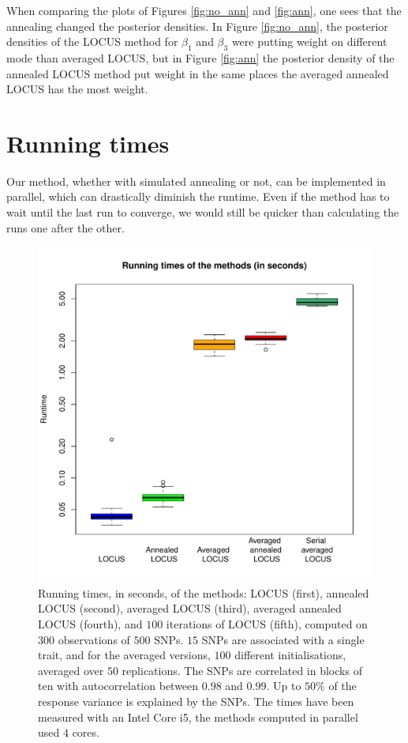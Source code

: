 \documentclass[a4paper, 11pt]{report}
\numberwithin{equation}{chapter}
\begin{document}
When comparing the plots of Figures \ref{fig:no_ann} and \ref{fig:ann}, one sees that the annealing changed the posterior densities. In Figure \ref{fig:no_ann}, the posterior densities of the LOCUS method for $\beta_1$ and $\beta_3$ were putting weight on different mode than averaged LOCUS, but in Figure \ref{fig:ann} the posterior density of the annealed LOCUS method put weight in the same places the averaged annealed LOCUS has the most weight. 

\section{Running times}

Our method, whether with simulated annealing or not, can be implemented in parallel, which can drastically diminish the runtime. Even if the method has to wait until the last run to converge, we would still be quicker than calculating the runs one after the other.

\begin{figure}[h]
\centering
\includegraphics[width=5in,bb= 0 0 7.24in 7.24in]{images/runtime.pdf}

\caption{\label{fig:runtime} Running times, in seconds, of the methods: LOCUS (first), annealed LOCUS (second), averaged LOCUS (third), averaged annealed LOCUS (fourth), and $100$ iterations of LOCUS (fifth), computed on $300$ observations of $500$ SNPs. $15$ SNPs are associated with a single trait, and for the averaged versions, $100$ different initialisations, averaged over $50$ replications. The SNPs are correlated in blocks of ten with autocorrelation between $0.98$ and $0.99$. Up to $50\%$ of the response variance is explained by the SNPs. The times have been measured with an Intel Core i5, the methods computed in parallel used $4$ cores.}
\end{figure}
\end{document}
